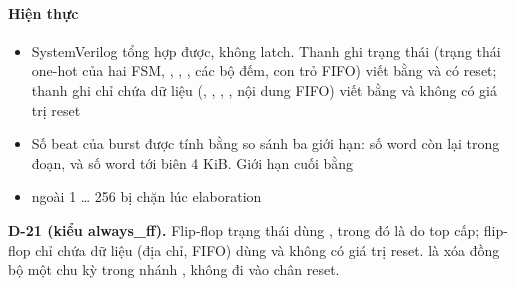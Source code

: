 \documentclass[10pt,a4paper]{article}
\begin{document}
\paragraph{Hiện thực}
\begin{itemize}
\item SystemVerilog tổng hợp được, không latch. Thanh ghi trạng thái (trạng thái one-hot của hai FSM, , , , các bộ đếm, con trỏ FIFO) viết bằng  và có reset; thanh ghi chỉ chứa dữ liệu (, , , , nội dung FIFO) viết bằng  và không có giá trị reset
\item Số beat của burst được tính bằng so sánh ba giới hạn: số word còn lại trong đoạn,  và số word tới biên 4 KiB. Giới hạn cuối bằng 
\item {} ngoài 1 … 256 bị chặn lúc elaboration
\end{itemize}

\begin{notebox}
\textbf{D-21 (kiểu always\_ff).} Flip-flop trạng thái dùng , trong đó  là  do top cấp; flip-flop chỉ chứa dữ liệu (địa chỉ, FIFO) dùng  và không có giá trị reset.  là xóa đồng bộ một chu kỳ trong nhánh , không đi vào chân reset.
\end{notebox}
\end{document}
